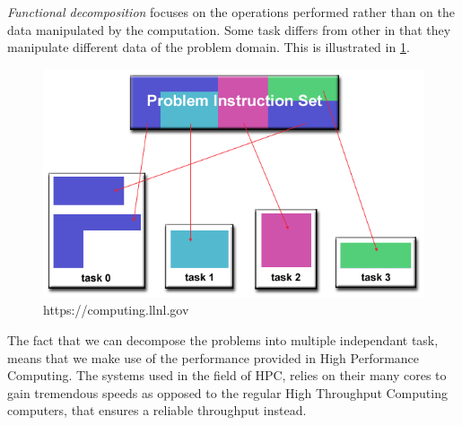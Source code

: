 \emph{Functional decomposition} focuses on the operations performed rather than on the data manipulated by the computation. Some task differs from other in that they manipulate different data of the problem domain. This is illustrated in \cref{fun}.

\begin{figure}[htbp]\label{fun}
\includegraphics[width=\textwidth]{Analysis/Supercomputing/functional_decomp.png}
\caption{https://computing.llnl.gov}
\end{figure}

The fact that we can decompose the problems into multiple independant task, means that we make use of the performance provided in High Performance Computing. The systems used in the field of HPC, relies on their many cores to gain tremendous speeds as opposed to the regular High Throughput Computing computers, that ensures a reliable throughput instead.